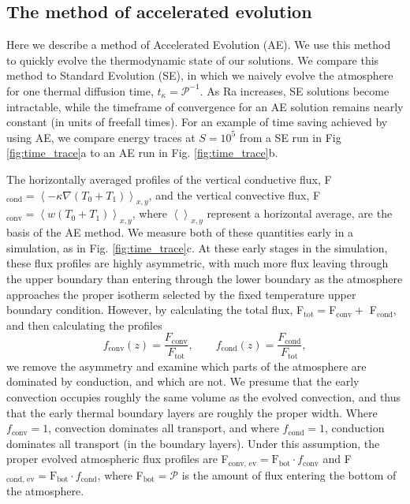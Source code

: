 \documentclass[aps, pre, onecolumn, nofootinbib, notitlepage, groupedaddress, amsfonts, amssymb, amsmath, longbibliography]{revtex4-1}
\newcommand{\angles}[1]{\ensuremath{\left\langle #1 \right\rangle}}
\newcommand{\grad}{\ensuremath{\nabla}}
\begin{document}
\subsection{The method of accelerated evolution}
\label{subsection:ae}
Here we describe a method of Accelerated Evolution (AE). We use this method to quickly evolve the
thermodynamic state of our solutions.  We compare this method to Standard Evolution
(SE), in which we naively evolve the atmosphere for one thermal diffusion time,
$t_\kappa = \mathcal{P}^{-1}$. As Ra increases, SE solutions become intractable, 
while the timeframe of convergence for an AE solution remains nearly constant
(in units of freefall times).
For an example of time saving achieved by using AE, we compare
energy traces at $S = 10^5$ from a SE run in Fig \ref{fig:time_trace}a to an AE run
in Fig. \ref{fig:time_trace}b.

The horizontally averaged profiles of the vertical conductive flux, 
F$_{\text{cond}} = \angles{-\kappa\grad(T_0 + T_1)}_{x,y}$, and the vertical convective flux,
F$_{\text{conv}} = \angles{w(T_0 + T_1)}_{x,y}$, where $\angles{}_{x,y}$ represent
a horizontal average, are the basis of the AE method. We measure
both of these quantities early in a simulation, as in Fig. \ref{fig:time_trace}c.
At these early stages in the simulation, these flux profiles are highly asymmetric,
with much more flux leaving through the upper boundary than entering through the
lower boundary as the atmosphere approaches the proper isotherm selected by the
fixed temperature upper boundary condition.
However, by calculating the total flux,
F$_{\text{tot}} = $F$_{\text{conv}} +$ F$_{\text{cond}}$, and then calculating the profiles
\begin{equation}
f_{\text{conv}}(z) = \frac{F_{\text{conv}}}{F_{\text{tot}}},\qquad
f_{\text{cond}}(z) = \frac{F_{\text{cond}}}{F_{\text{tot}}},
\label{eqn:bvp_ratios}
\end{equation}
we remove the asymmetry and examine which parts of the atmosphere are dominated
by conduction, and which are not.
We presume that the early convection occupies roughly the same volume as the evolved
convection, and thus that the early thermal boundary layers are roughly the proper
width.  Where $f_{\text{conv}} = 1$, convection dominates all transport, and where
$f_{\text{cond}} = 1$, conduction dominates all transport (in the boundary
layers). Under this assumption, the proper evolved atmospheric flux profiles
are F$_{\text{conv, ev}} = \text{F}_{\text{bot}}\cdot f_{\text{conv}}$
and F$_{\text{cond, ev}} = \text{F}_{\text{bot}}\cdot f_{\text{cond}}$,
where F$_{\text{bot}} = \mathcal{P}$ is the amount of flux entering the
bottom of the atmosphere.
\end{document}
